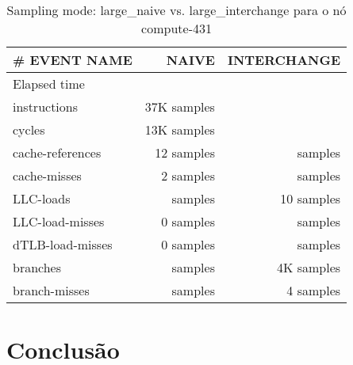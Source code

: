 \documentclass[conference,compsoc]{IEEEtran}
\begin{document}
 \begin{table}[H]
  \caption{Sampling mode: large\_naive vs. large\_interchange
 para o nó compute-431}
  \label{table:search_sampling}
  \centering
  \begin{tabular}{ | l | r | r |   }

  \hline
  \# EVENT NAME	 & NAIVE  & INTERCHANGE \\ \hline   
  Elapsed time & &  \\ \hline    
  instructions	& 37K samples  \\ \hline    
cycles	&  13K samples  \\ \hline    
cache-references	& 12 samples &  samples \\ \hline    
cache-misses	& 2 samples &  samples \\ \hline    
LLC-loads	& samples &  10 samples \\ \hline    
LLC-load-misses	& 0 samples &  samples \\ \hline    
dTLB-load-misses	& 0 samples &  samples \\ \hline    
branches	& samples &  4K samples \\ \hline    
branch-misses	& samples & 4 samples \\ \hline    

   \end{tabular}
  \end{table}



  \section{Conclusão}











\end{document}
